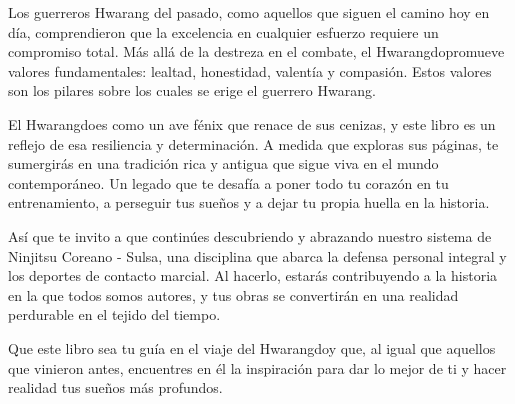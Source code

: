 Los guerreros Hwarang del pasado, como aquellos que siguen el camino hoy en día, comprendieron que la excelencia en cualquier esfuerzo requiere un compromiso total. Más allá de la destreza en el combate, el Hwarangdo\textregistered promueve valores fundamentales: lealtad, honestidad, valentía y compasión. Estos valores son los pilares sobre los cuales se erige el guerrero Hwarang.

El Hwarangdo\textregistered es como un ave fénix que renace de sus cenizas, y este libro es un reflejo de esa resiliencia y determinación. A medida que exploras sus páginas, te sumergirás en una tradición rica y antigua que sigue viva en el mundo contemporáneo. Un legado que te desafía a poner todo tu corazón en tu entrenamiento, a perseguir tus sueños y a dejar tu propia huella en la historia.

Así que te invito a que continúes descubriendo y abrazando nuestro sistema de Ninjitsu Coreano - Sulsa, una disciplina que abarca la defensa personal integral y los deportes de contacto marcial. Al hacerlo, estarás contribuyendo a la historia en la que todos somos autores, y tus obras se convertirán en una realidad perdurable en el tejido del tiempo.

Que este libro sea tu guía en el viaje del Hwarangdo\textregistered y que, al igual que aquellos que vinieron antes, encuentres en él la inspiración para dar lo mejor de ti y hacer realidad tus sueños más profundos.

\mainmatter %